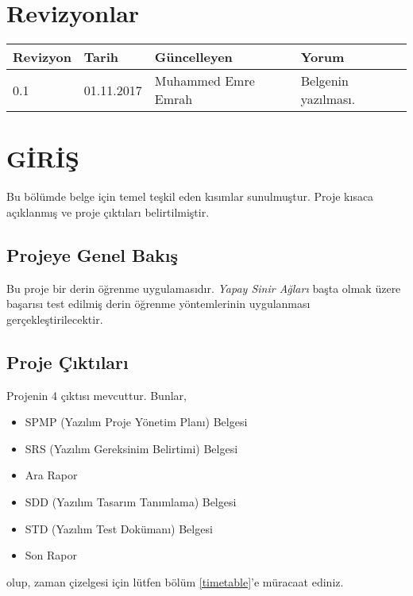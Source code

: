 \documentclass[12pt,a4paper]{article}
\begin{document}
   
   \newpage

   \section*{Revizyonlar}
   \begin{center}
      \begin{tabu} to 1.0\textwidth {| X[l] |  X[c] |  X[c] | X[c] |}
      \hline
      Revizyon & Tarih & Güncelleyen & Yorum \\[0.5ex]
      \hline{} & 01.11.2017 & Muhammed Emre Emrah & Belgenin yazılması. \\
      \hline
      \end{tabu}
   \end{center}
   \newpage

   \tableofcontents
   \newpage


   \section{GİRİŞ}
   Bu bölümde belge için temel teşkil eden kısımlar sunulmuştur. Proje kısaca açıklanmış ve proje çıktıları belirtilmiştir.

   \subsection{Projeye Genel Bakış}
   Bu proje bir derin öğrenme uygulamasıdır. \textit{Yapay Sinir Ağları} başta olmak üzere başarısı test edilmiş derin öğrenme yöntemlerinin uygulanması
   gerçekleştirilecektir.

   \subsection{Proje Çıktıları}
   Projenin 4 çıktısı mevcuttur. Bunlar,
   \begin{itemize}
      \item SPMP (Yazılım Proje Yönetim Planı) Belgesi
      \item SRS (Yazılım Gereksinim Belirtimi) Belgesi
      \item Ara Rapor
      \item SDD (Yazılım Tasarım Tanımlama) Belgesi
      \item STD (Yazılım Test Dokümanı) Belgesi
      \item Son Rapor
   \end{itemize}
   olup, zaman çizelgesi için lütfen bölüm \ref{timetable}'e müracaat ediniz.
\end{document}
